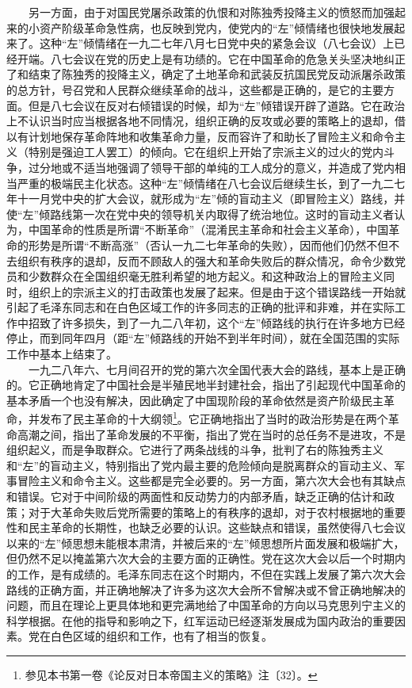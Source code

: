 \documentclass[cn,11pt,chinese]{elegantbook}
\begin{document}
　　另一方面，由于对国民党屠杀政策的仇恨和对陈独秀投降主义的愤怒而加强起来的小资产阶级革命急性病，也反映到党内，使党内的“左”倾情绪也很快地发展起来了。这种“左”倾情绪在一九二七年八月七日党中央的紧急会议（八七会议）上已经开端。八七会议在党的历史上是有功绩的。它在中国革命的危急关头坚决地纠正了和结束了陈独秀的投降主义，确定了土地革命和武装反抗国民党反动派屠杀政策的总方针，号召党和人民群众继续革命的战斗，这些都是正确的，是它的主要方面。但是八七会议在反对右倾错误的时候，却为“左”倾错误开辟了道路。它在政治上不认识当时应当根据各地不同情况，组织正确的反攻或必要的策略上的退却，借以有计划地保存革命阵地和收集革命力量，反而容许了和助长了冒险主义和命令主义（特别是强迫工人罢工）的倾向。它在组织上开始了宗派主义的过火的党内斗争，过分地或不适当地强调了领导干部的单纯的工人成分的意义，并造成了党内相当严重的极端民主化状态。这种“左”倾情绪在八七会议后继续生长，到了一九二七年十一月党中央的扩大会议，就形成为“左”倾的盲动主义（即冒险主义）路线，并使“左”倾路线第一次在党中央的领导机关内取得了统治地位。这时的盲动主义者认为，中国革命的性质是所谓“不断革命”（混淆民主革命和社会主义革命），中国革命的形势是所谓“不断高涨”（否认一九二七年革命的失败），因而他们仍然不但不去组织有秩序的退却，反而不顾敌人的强大和革命失败后的群众情况，命令少数党员和少数群众在全国组织毫无胜利希望的地方起义。和这种政治上的冒险主义同时，组织上的宗派主义的打击政策也发展了起来。但是由于这个错误路线一开始就引起了毛泽东同志和在白色区域工作的许多同志的正确的批评和非难，并在实际工作中招致了许多损失，到了一九二八年初，这个“左”倾路线的执行在许多地方已经停止，而到同年四月（距“左”倾路线的开始不到半年时间），就在全国范围的实际工作中基本上结束了。\\
　　一九二八年六、七月间召开的党的第六次全国代表大会的路线，基本上是正确的。它正确地肯定了中国社会是半殖民地半封建社会，指出了引起现代中国革命的基本矛盾一个也没有解决，因此确定了中国现阶段的革命依然是资产阶级民主革命，并发布了民主革命的十大纲领\footnote[4]{ 参见本书第一卷《论反对日本帝国主义的策略》注〔32〕。}。它正确地指出了当时的政治形势是在两个革命高潮之间，指出了革命发展的不平衡，指出了党在当时的总任务不是进攻，不是组织起义，而是争取群众。它进行了两条战线的斗争，批判了右的陈独秀主义和“左”的盲动主义，特别指出了党内最主要的危险倾向是脱离群众的盲动主义、军事冒险主义和命令主义。这些都是完全必要的。另一方面，第六次大会也有其缺点和错误。它对于中间阶级的两面性和反动势力的内部矛盾，缺乏正确的估计和政策；对于大革命失败后党所需要的策略上的有秩序的退却，对于农村根据地的重要性和民主革命的长期性，也缺乏必要的认识。这些缺点和错误，虽然使得八七会议以来的“左”倾思想未能根本肃清，并被后来的“左”倾思想所片面发展和极端扩大，但仍然不足以掩盖第六次大会的主要方面的正确性。党在这次大会以后一个时期内的工作，是有成绩的。毛泽东同志在这个时期内，不但在实践上发展了第六次大会路线的正确方面，并正确地解决了许多为这次大会所不曾解决或不曾正确地解决的问题，而且在理论上更具体地和更完满地给了中国革命的方向以马克思列宁主义的科学根据。在他的指导和影响之下，红军运动已经逐渐发展成为国内政治的重要因素。党在白色区域的组织和工作，也有了相当的恢复。\\
\end{document}
